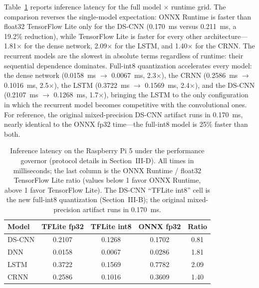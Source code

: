 \documentclass[conference,a4paper]{IEEEtran}
\begin{document}
Table~\ref{tab:lat} reports inference latency for the full model $\times$ runtime grid. The comparison reverses the single-model expectation: ONNX Runtime is faster than float32 TensorFlow Lite only for the DS-CNN (0.170~ms versus 0.211~ms, a 19.2\% reduction), while TensorFlow Lite is faster for every other architecture---1.81$\times$ for the dense network, 2.09$\times$ for the LSTM, and 1.40$\times$ for the CRNN. The recurrent models are the slowest in absolute terms regardless of runtime: their sequential dependence dominates. Full-int8 quantization accelerates every model: the dense network (0.0158~ms $\rightarrow$ 0.0067~ms, 2.3$\times$), the CRNN (0.2586~ms $\rightarrow$ 0.1016~ms, 2.5$\times$), the LSTM (0.3722~ms $\rightarrow$ 0.1569~ms, 2.4$\times$), and the DS-CNN (0.2107~ms $\rightarrow$ 0.1268~ms, 1.7$\times$), bringing the LSTM to the only configuration in which the recurrent model becomes competitive with the convolutional ones. For reference, the original mixed-precision DS-CNN artifact runs in 0.170~ms, nearly identical to the ONNX fp32 time---the full-int8 model is 25\% faster than both.

\begin{table}[t]
\caption{Inference latency on the Raspberry Pi 5 under the performance governor (protocol details in Section~III-D). All times in milliseconds; the last column is the ONNX Runtime / float32 TensorFlow Lite ratio (values below 1 favor ONNX Runtime, above 1 favor TensorFlow Lite). The DS-CNN ``TFLite int8'' cell is the new full-int8 quantization (Section~III-B); the original mixed-precision artifact runs in 0.170~ms.}
\label{tab:lat}
\centering
{\footnotesize
\setlength{\tabcolsep}{4pt}
\begin{tabular}{lcccc}
\toprule
Model & TFLite fp32 & TFLite int8 & ONNX fp32 & Ratio \\
\midrule
DS-CNN & 0.2107 & 0.1268 & 0.1702 & 0.81 \\
DNN & 0.0158 & 0.0067 & 0.0286 & 1.81 \\
LSTM & 0.3722 & 0.1569 & 0.7782 & 2.09 \\
CRNN & 0.2586 & 0.1016 & 0.3609 & 1.40 \\
\bottomrule
\end{tabular}
}
\end{table}
\end{document}
